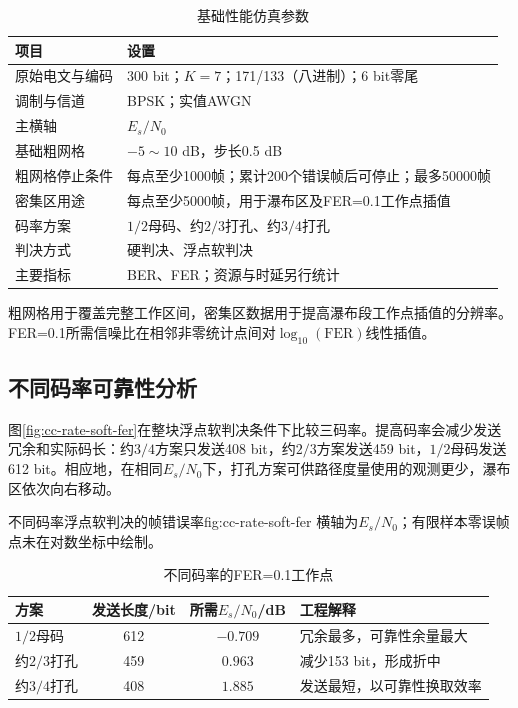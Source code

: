 \begin{table}[htbp]
  \centering
  \small
  \caption{基础性能仿真参数}
  \label{tab:cc-simulation-settings}
  \begin{tabular}{p{}p{}}
    \toprule
    项目 & 设置 \\
    \midrule
    原始电文与编码 & 300 bit；$K=7$；171/133（八进制）；6 bit零尾 \\
    调制与信道 & BPSK；实值AWGN \\
    主横轴 & $E_s/N_0$ \\
    基础粗网格 & $-5\sim10$ dB，步长0.5 dB \\
    粗网格停止条件 & 每点至少1000帧；累计200个错误帧后可停止；最多50000帧 \\
    密集区用途 & 每点至少5000帧，用于瀑布区及FER=0.1工作点插值 \\
    码率方案 & $1/2$母码、约$2/3$打孔、约$3/4$打孔 \\
    判决方式 & 硬判决、浮点软判决 \\
    主要指标 & BER、FER；资源与时延另行统计 \\
    \bottomrule
  \end{tabular}
\end{table}

粗网格用于覆盖完整工作区间，密集区数据用于提高瀑布段工作点插值的分辨率。FER=0.1所需信噪比在相邻非零统计点间对$\log_{10}(\mathrm{FER})$线性插值。

\subsection{不同码率可靠性分析}

图\ref{fig:cc-rate-soft-fer}在整块浮点软判决条件下比较三码率。提高码率会减少发送冗余和实际码长：约$3/4$方案只发送408 bit，约$2/3$方案发送459 bit，$1/2$母码发送612 bit。相应地，在相同$E_s/N_0$下，打孔方案可供路径度量使用的观测更少，瀑布区依次向右移动。

  {不同码率浮点软判决的帧错误率}{fig:cc-rate-soft-fer}
  {横轴为$E_s/N_0$；有限样本零误帧点未在对数坐标中绘制。}

\begin{table}[htbp]
  \centering
  \small
  \caption{不同码率的FER=0.1工作点}
  \label{tab:cc-rate-fer01}
  \begin{tabular}{p{}c c p{}}
    \toprule
    方案 & 发送长度/bit & 所需$E_s/N_0$/dB & 工程解释 \\
    \midrule
    $1/2$母码 & 612 & $-0.709$ & 冗余最多，可靠性余量最大 \\
    约$2/3$打孔 & 459 & $0.963$ & 减少153 bit，形成折中 \\
    约$3/4$打孔 & 408 & $1.885$ & 发送最短，以可靠性换取效率 \\
    \bottomrule
  \end{tabular}
\end{table}

